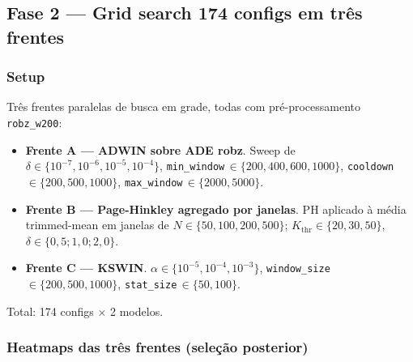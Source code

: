 \documentclass[11pt,a4paper]{article}
\begin{document}
\subsection{Fase 2 --- Grid search 174 configs em tr\^es frentes}

\subsubsection{Setup}

Tr\^es frentes paralelas de busca em grade, todas com pr\'e-processamento
\texttt{robz\_w200}:

\begin{itemize}[leftmargin=1.4em,itemsep=2pt]
    \item \textbf{Frente A --- ADWIN sobre ADE robz}. Sweep de
          $\delta\!\in\!\{10^{-7},10^{-6},10^{-5},10^{-4}\}$,
          \texttt{min\_window}\,$\in\!\{200, 400, 600, 1000\}$,
          \texttt{cooldown}\,$\in\!\{200, 500, 1000\}$,
          \texttt{max\_window}\,$\in\!\{2000, 5000\}$.
    \item \textbf{Frente B --- Page-Hinkley agregado por janelas}.
          PH aplicado \`a m\'edia trimmed-mean em janelas de
          $N\!\in\!\{50, 100, 200, 500\}$;
          $K_\text{thr}\!\in\!\{20, 30, 50\}$, $\delta\!\in\!\{0{,}5;1{,}0;2{,}0\}$.
    \item \textbf{Frente C --- KSWIN}. $\alpha\!\in\!\{10^{-5},10^{-4},10^{-3}\}$,
          \texttt{window\_size}\,$\in\!\{200, 500, 1000\}$,
          \texttt{stat\_size}\,$\in\!\{50, 100\}$.
\end{itemize}

Total: 174 configs $\times$ 2 modelos.

\subsubsection{Heatmaps das tr\^es frentes (sele\c{c}\~ao posterior)}
\end{document}
